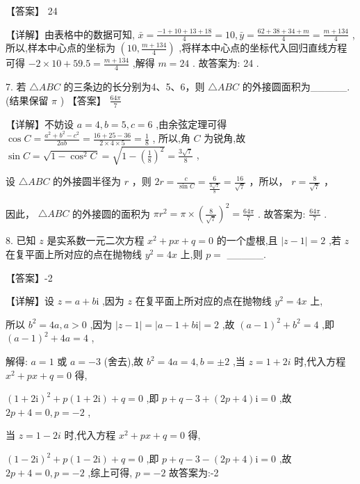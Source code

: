 \documentclass[10pt]{article}
\begin{document}
【答案】 24

【详解】由表格中的数据可知, \(\bar{x} = \frac{-1 + {10} + {13} + {18}}{4} = {10},\bar{y} = \frac{{62} + {38} + {34} + m}{4} = \frac{m + {134}}{4}\) , 所以,样本中心点的坐标为 \(\left( {{10},\frac{m + {134}}{4}}\right)\) ,将样本中心点的坐标代入回归直线方程可得 \(- 2 \times  {10} + {59.5} = \frac{m + {134}}{4}\) ,解得 \(m = {24}\) . 故答案为: 24 .

7. 若 \(\bigtriangleup  {ABC}\) 的三条边的长分别为4、5、6，则 \(\bigtriangleup  {ABC}\) 的外接圆面积为\_\_\_\_\_.(结果保留 \(\pi\) ) 【答案】 \(\frac{64\pi }{7}\)

【详解】不妨设 \(a = 4,b = 5,c = 6\) ,由余弦定理可得 \(\cos C = \frac{{a}^{2} + {b}^{2} - {c}^{2}}{2ab} = \frac{{16} + {25} - {36}}{2 \times  4 \times  5} = \frac{1}{8}\) , 所以,角 \(C\) 为锐角,故 \(\sin C = \sqrt{1 - {\cos }^{2}C} = \sqrt{1 - {\left( \frac{1}{8}\right) }^{2}} = \frac{3\sqrt{7}}{8}\) ,

设 \(\bigtriangleup  {ABC}\) 的外接圆半径为 \(r\) ，则 \({2r} = \frac{c}{\sin C} = \frac{6}{\frac{3\sqrt{7}}{8}} = \frac{16}{\sqrt{7}}\) ，所以， \(r = \frac{8}{\sqrt{7}}\) ，

因此， \(\bigtriangleup  {ABC}\) 的外接圆的面积为 \(\pi {r}^{2} = \pi  \times  {\left( \frac{8}{\sqrt{7}}\right) }^{2} = \frac{64\pi }{7}\) . 故答案为: \(\frac{64\pi }{7}\) .

8. 已知 \(z\) 是实系数一元二次方程 \({x}^{2} + {px} + q = 0\) 的一个虚根,且 \(\left| {z - 1}\right|  = 2\) ,若 \(z\) 在复平面上所对应的点在抛物线 \({y}^{2} = {4x}\) 上,则 \(p =\) \_\_\_\_\_.

【答案】-2

【详解】设 \(z = a + b\mathrm{i}\) ,因为 \(z\) 在复平面上所对应的点在抛物线 \({y}^{2} = {4x}\) 上,

所以 \({b}^{2} = {4a},a > 0\) ,因为 \(\left| {z - 1}\right|  = \left| {a - 1 + b\mathrm{i}}\right|  = 2\) ,故 \({\left( a - 1\right) }^{2} + {b}^{2} = 4\) ,即 \({\left( a - 1\right) }^{2} + {4a} = 4\) ,

解得: \(a = 1\) 或 \(a =  - 3\) (舍去),故 \({b}^{2} = {4a} = 4,b =  \pm  2\) ,当 \(z = 1 + {2i}\) 时,代入方程 \({x}^{2} + {px} + q = 0\) 得,

\({\left( 1 + 2\mathrm{i}\right) }^{2} + p\left( {1 + 2\mathrm{i}}\right)  + q = 0\) ,即 \(p + q - 3 + \left( {{2p} + 4}\right) \mathrm{i} = 0\) ,故 \({2p} + 4 = 0,p =  - 2\) ,

当 \(z = 1 - {2i}\) 时,代入方程 \({x}^{2} + {px} + q = 0\) 得,

\({\left( 1 - 2\mathrm{i}\right) }^{2} + p\left( {1 - 2\mathrm{i}}\right)  + q = 0\) ,即 \(p + q - 3 - \left( {{2p} + 4}\right) \mathrm{i} = 0\) ,故 \({2p} + 4 = 0,p =  - 2\) ,综上可得, \(p =  - 2\) 故答案为:-2
\end{document}

